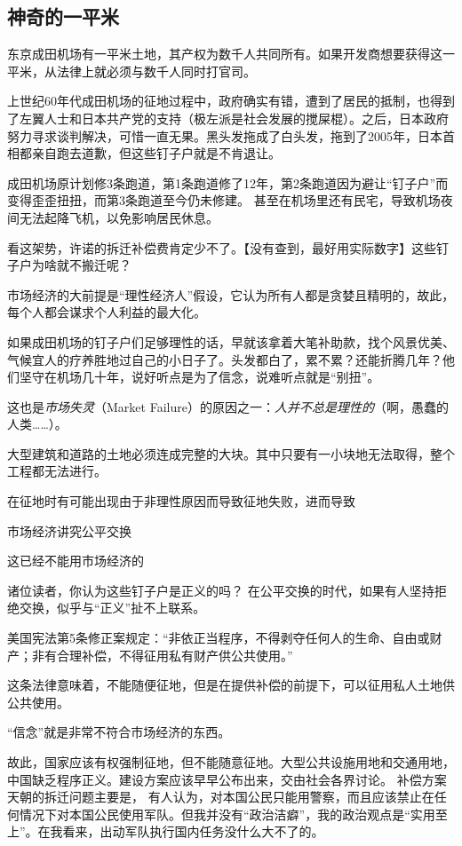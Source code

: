 \subsection{神奇的一平米}

东京成田机场有一平米土地，其产权为数千人共同所有。如果开发商想要获得这一平米，从法律上就必须与数千人同时打官司。

上世纪60年代成田机场的征地过程中，政府确实有错，遭到了居民的抵制，也得到了左翼人士和日本共产党的支持（极左派是社会发展的搅屎棍）。之后，日本政府努力寻求谈判解决，可惜一直无果。黑头发拖成了白头发，拖到了2005年，日本首相都亲自跑去道歉，但这些钉子户就是不肯退让。

成田机场原计划修3条跑道，第1条跑道修了12年，第2条跑道因为避让“钉子户”而变得歪歪扭扭，而第3条跑道至今仍未修建。 甚至在机场里还有民宅，导致机场夜间无法起降飞机，以免影响居民休息。

看这架势，许诺的拆迁补偿费肯定少不了。【没有查到，最好用实际数字】这些钉子户为啥就不搬迁呢？


市场经济的大前提是“理性经济人”假设，它认为所有人都是贪婪且精明的，故此，每个人都会谋求个人利益的最大化。

如果成田机场的钉子户们足够理性的话，早就该拿着大笔补助款，找个风景优美、气候宜人的疗养胜地过自己的小日子了。头发都白了，累不累？还能折腾几年？他们坚守在机场几十年，说好听点是为了信念，说难听点就是“别扭”。

这也是\emph{市场失灵}（Market Failure）的原因之一：\emph{人并不总是理性的}（啊，愚蠢的人类……）。

大型建筑和道路的土地必须连成完整的大块。其中只要有一小块地无法取得，整个工程都无法进行。

在征地时有可能出现由于非理性原因而导致征地失败，进而导致

市场经济讲究公平交换

这已经不能用市场经济的

诸位读者，你认为这些钉子户是正义的吗？
在公平交换的时代，如果有人坚持拒绝交换，似乎与“正义”扯不上联系。

美国宪法第5条修正案规定：“非依正当程序，不得剥夺任何人的生命、自由或财产；非有合理补偿，不得征用私有财产供公共使用。”

这条法律意味着，不能随便征地，但是在提供补偿的前提下，可以征用私人土地供公共使用。


“信念”就是非常不符合市场经济的东西。


故此，国家应该有权强制征地，但不能随意征地。大型公共设施用地和交通用地，
中国缺乏程序正义。建设方案应该早早公布出来，交由社会各界讨论。
补偿方案
天朝的拆迁问题主要是，
有人认为，对本国公民只能用警察，而且应该禁止在任何情况下对本国公民使用军队。但我并没有“政治洁癖”，我的政治观点是“实用至上”。在我看来，出动军队执行国内任务没什么大不了的。

